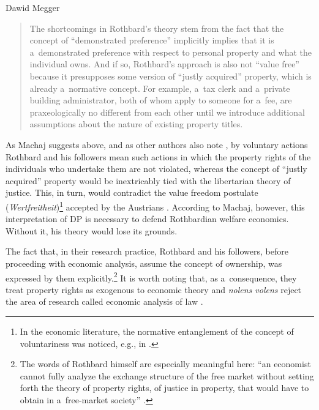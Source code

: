 \begin{artengenv}{Dawid Megger}
\begin{quote}
The shortcomings in Rothbard's theory stem from the fact that the concept of ``demonstrated preference'' implicitly implies that it is a~demonstrated preference with respect to personal property and what the individual owns. And if so, Rothbard's approach is also not ``value free'' because it presupposes some version of ``justly acquired'' property, which is already a~normative concept. For example, a~tax clerk and a~private building administrator, both of whom apply to someone for a~fee, are praxeologically no different from each other until we introduce additional assumptions about the nature of existing property titles.
\parencite[][own transl.]{machaj_murray_2014}%
\end{quote}




As Machaj suggests above, and as other authors also note 
\parencite[e.g.,][]{cordato_welfare_1992}, %
 by voluntary actions Rothbard and his followers mean such actions in which the property rights of the individuals who undertake them are not violated, whereas the concept of ``justly acquired'' property would be inextricably tied with the libertarian theory of justice. This, in turn, would contradict the value freedom postulate (\textit{Wertfreitheit})\footnote{In the economic literature, the normative entanglement of the concept of voluntariness was noticed, e.g., in 
\parencites[][]{high_is_1985}[][]{hausman_economic_2006}.%
} accepted by the Austrians 
\parencites[e.g.,][]{mises_human_1998}[][]{rothbard_praxeology_2011}[][]{kirzner_value-freedom_1994}[][]{block_value_2005}. %
 According to Machaj, however, this interpretation of DP is necessary to defend Rothbardian welfare economics. Without it, his theory would lose its grounds.



The fact that, in their research practice, Rothbard and his followers, before proceeding with economic analysis, assume the concept of ownership, was expressed by them explicitly.\footnote{The words of Rothbard himself are especially meaningful here: ``an economist cannot fully analyze the exchange structure of the free market without setting forth the theory of property rights, of justice in property, that would have to obtain in a~free-market society'' 
\parencites[][]{block_ethics_1995}[][]{block_private-property_2000}[][]{hulsmann_priori_2004}[][p.1047]{rothbard_power_2009}[][]{rothbard_man_2009}.%
} It is worth noting that, as a~consequence, they treat property rights as exogenous to economic theory and \textit{nolens volens} reject the area of research called economic analysis of law 
\parencite[see:][]{machaj_murray_2014}.%





\end{artengenv}
